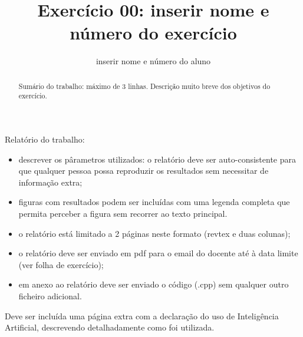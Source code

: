\documentclass[aps,pre,twocolumn,showpacs,amsmath,amssymb]{revtex4-1}
\begin{document}
\title{Exercício 00: inserir nome e número do exercício}

\author{inserir nome e número do aluno}

\begin{abstract} 
  Sumário do trabalho: máximo de 3 linhas. Descrição muito breve dos objetivos do exercício.
\end{abstract}

\maketitle

Relatório do trabalho:

\begin{itemize}
%
\item descrever os pârametros utilizados: o relatório deve ser auto-consistente para que qualquer pessoa possa reproduzir os resultados sem necessitar de informação extra;
\item figuras com resultados podem ser incluídas com uma legenda completa que permita perceber a figura sem recorrer ao texto principal.
\item o relatório está limitado a 2 páginas neste formato (revtex e duas colunas);
\item o relatório deve ser enviado em pdf para o email do docente até à data limite (ver folha de exercício);
\item em anexo ao relatório deve ser enviado o código (.cpp) sem qualquer outro ficheiro adicional.
%
\end{itemize}

Deve ser incluída uma página extra com a declaração do uso de Inteligência Artificial,  descrevendo detalhadamente como foi utilizada.
\end{document}
